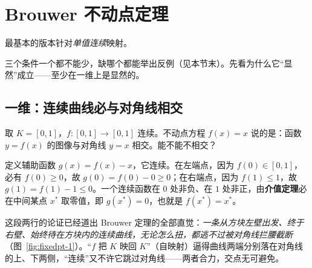 
\section{Brouwer 不动点定理}
\label{sec:fixedpt-brouwer}

最基本的版本针对\emph{单值连续}映射。


三个条件一个都不能少，缺哪个都能举出反例（见本节末）。先看为什么它``显然''成立——至少在一维上是显然的。

\subsection{一维：连续曲线必与对角线相交}
\label{sec:fixedpt-1d}

取 $K=[0,1]$，$f:[0,1]\to[0,1]$ 连续。不动点方程 $f(x)=x$ 说的是：函数 $y=f(x)$ 的图像与对角线 $y=x$ 相交。能不能不相交？

定义辅助函数 $g(x)=f(x)-x$，它连续。在左端点，因为 $f(0)\in[0,1]$，必有 $f(0)\ge 0$，故 $g(0)=f(0)-0\ge 0$；在右端点，因为 $f(1)\le 1$，故 $g(1)=f(1)-1\le 0$。一个连续函数在 $0$ 处非负、在 $1$ 处非正，由\textbf{介值定理}必在中间某点 $x^*$ 取零值，即 $g(x^*)=0$，也就是 $f(x^*)=x^*$。

这段两行的论证已经道出 Brouwer 定理的全部直觉：\emph{一条从方块左壁出发、终于右壁、始终待在方块内的连续曲线，无论怎么扭，都逃不过被对角线拦腰截断}（图~\ref{fig:fixedpt-1}）。``$f$ 把 $K$ 映回 $K$''（自映射）逼得曲线两端分别落在对角线的上、下两侧，``连续''又不许它跳过对角线——两者合力，交点无可避免。

